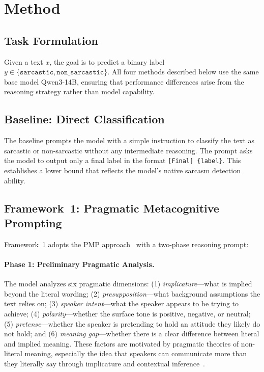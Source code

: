 \documentclass{article}
\begin{document}
\section{Method}

\subsection{Task Formulation}

Given a text $x$, the goal is to predict a binary label $y \in \{\texttt{sarcastic}, \texttt{non\_sarcastic}\}$. All four methods described below use the same base model Qwen3-14B, ensuring that performance differences arise from the reasoning strategy rather than model capability.

\subsection{Baseline: Direct Classification}

The baseline prompts the model with a simple instruction to classify the text as sarcastic or non-sarcastic without any intermediate reasoning. The prompt asks the model to output only a final label in the format \texttt{[Final] \{label\}}. This establishes a lower bound that reflects the model's native sarcasm detection ability.

\subsection{Framework~1: Pragmatic Metacognitive Prompting}

Framework~1 adopts the PMP approach~\citep{pmp} with a two-phase reasoning prompt:

\paragraph{Phase 1: Preliminary Pragmatic Analysis.}
The model analyzes six pragmatic dimensions: (1) \textit{implicature}---what is implied beyond the literal wording; (2) \textit{presupposition}---what background assumptions the text relies on; (3) \textit{speaker intent}---what the speaker appears to be trying to achieve; (4) \textit{polarity}---whether the surface tone is positive, negative, or neutral; (5) \textit{pretense}---whether the speaker is pretending to hold an attitude they likely do not hold; and (6) \textit{meaning gap}---whether there is a clear difference between literal and implied meaning. These factors are motivated by pragmatic theories of non-literal meaning, especially the idea that speakers can communicate more than they literally say through implicature and contextual inference~\citep{grice1975}.
\end{document}

